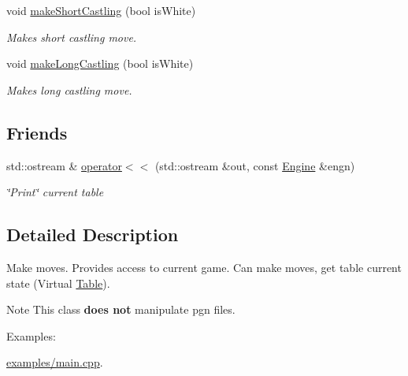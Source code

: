 \begin{DoxyCompactItemize}
void \hyperlink{classChEngn_1_1Engine_a4d6deb7c26002fd2a39367a0fcc9b75e}{makeShortCastling} (bool isWhite)
\begin{DoxyCompactList}\small\item\em Makes short castling move. \item\end{DoxyCompactList}\item 
void \hyperlink{classChEngn_1_1Engine_ac054d7b903d1b353dcfc80a6cbd32aba}{makeLongCastling} (bool isWhite)
\begin{DoxyCompactList}\small\item\em Makes long castling move. \item\end{DoxyCompactList}\end{DoxyCompactItemize}
\subsection*{Friends}
\begin{DoxyCompactItemize}
\item 
\hypertarget{classChEngn_1_1Engine_a886da6512b271d26a1fee49a317d2308}{
std::ostream \& \hyperlink{classChEngn_1_1Engine_a886da6512b271d26a1fee49a317d2308}{operator$<$$<$} (std::ostream \&out, const \hyperlink{classChEngn_1_1Engine}{Engine} \&engn)}
\label{classChEngn_1_1Engine_a886da6512b271d26a1fee49a317d2308}

\begin{DoxyCompactList}\small\item\em \char`\"{}Print\char`\"{} current table \item\end{DoxyCompactList}\end{DoxyCompactItemize}


\subsection{Detailed Description}
Make moves. Provides access to current game. Can make moves, get table current state (Virtual \hyperlink{classChEngn_1_1Table}{Table}).

\begin{DoxyNote}{Note}
This class {\bfseries does not} manipulate pgn files. 
\end{DoxyNote}
\begin{Desc}
\item[Examples: ]\par


\hyperlink{examples_2main_8cpp-example}{examples/main.cpp}.

\end{Desc}


